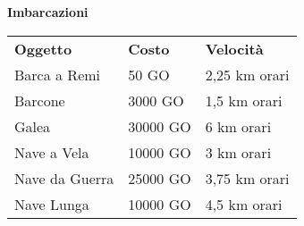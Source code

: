 \documentclass[12pt,a4paper,twoside,openany]{book}
\begin{document}
\bigskip

\begin{center}

\textbf{Imbarcazioni}\medskip

\begin{tabular}{lll}
\toprule
\textbf{Oggetto}&\textbf{Costo}&\textbf{Velocità}\\
Barca a Remi&50 GO&2,25 km orari\\
Barcone&3000 GO&1,5 km orari\\
Galea&30000 GO&6 km orari\\
Nave a Vela&10000 GO&3 km orari\\
Nave da Guerra&25000 GO&3,75 km orari\\
Nave Lunga&10000 GO&4,5 km orari\\
\end{tabular}
\end{center}
\end{document}
